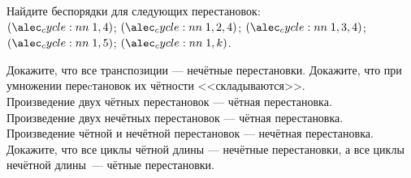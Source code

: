 \documentclass[a4paper,12pt]{article}
\begin{document}
    \problem Найдите беспорядки для следующих перестановок: \\
    \sub $\cycle{1,4}$; 
    \sub $\cycle{1,2,4}$; 
    \sub $\cycle{1,3,4}$; 
    \sub $\cycle{1,5}$; 
    \sub $\cycle{1,k}$. 
    
    \problem Докажите, что все транспозиции --- нечётные перестановки.
     Докажите, что при умножении переcтановок их чётности <<складываются>>. \\ 
    Произведение двух чётных перестановок --- чётная перестановка. \\
    Произведение двух нечётных перестановок --- чётная перестановка. \\
    Произведение чётной и нечётной перестановок --- нечётная перестановка.
    \problem Докажите, что все циклы чётной длины --- нечётные перестановки, а все циклы нечётной длины~--- чётные перестановки.
\end{document}
